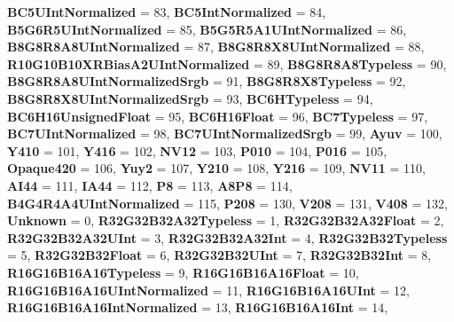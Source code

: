\begin{DoxyCompactItemize}
{\bfseries B\+C5\+U\+Int\+Normalized} = 83, 
{\bfseries B\+C5\+Int\+Normalized} = 84, 
\newline
{\bfseries B5\+G6\+R5\+U\+Int\+Normalized} = 85, 
{\bfseries B5\+G5\+R5\+A1\+U\+Int\+Normalized} = 86, 
{\bfseries B8\+G8\+R8\+A8\+U\+Int\+Normalized} = 87, 
{\bfseries B8\+G8\+R8\+X8\+U\+Int\+Normalized} = 88, 
\newline
{\bfseries R10\+G10\+B10\+X\+R\+Bias\+A2\+U\+Int\+Normalized} = 89, 
{\bfseries B8\+G8\+R8\+A8\+Typeless} = 90, 
{\bfseries B8\+G8\+R8\+A8\+U\+Int\+Normalized\+Srgb} = 91, 
{\bfseries B8\+G8\+R8\+X8\+Typeless} = 92, 
\newline
{\bfseries B8\+G8\+R8\+X8\+U\+Int\+Normalized\+Srgb} = 93, 
{\bfseries B\+C6\+H\+Typeless} = 94, 
{\bfseries B\+C6\+H16\+Unsigned\+Float} = 95, 
{\bfseries B\+C6\+H16\+Float} = 96, 
\newline
{\bfseries B\+C7\+Typeless} = 97, 
{\bfseries B\+C7\+U\+Int\+Normalized} = 98, 
{\bfseries B\+C7\+U\+Int\+Normalized\+Srgb} = 99, 
{\bfseries Ayuv} = 100, 
\newline
{\bfseries Y410} = 101, 
{\bfseries Y416} = 102, 
{\bfseries N\+V12} = 103, 
{\bfseries P010} = 104, 
\newline
{\bfseries P016} = 105, 
{\bfseries Opaque420} = 106, 
{\bfseries Yuy2} = 107, 
{\bfseries Y210} = 108, 
\newline
{\bfseries Y216} = 109, 
{\bfseries N\+V11} = 110, 
{\bfseries A\+I44} = 111, 
{\bfseries I\+A44} = 112, 
\newline
{\bfseries P8} = 113, 
{\bfseries A8\+P8} = 114, 
{\bfseries B4\+G4\+R4\+A4\+U\+Int\+Normalized} = 115, 
{\bfseries P208} = 130, 
\newline
{\bfseries V208} = 131, 
{\bfseries V408} = 132, 
{\bfseries Unknown} = 0, 
{\bfseries R32\+G32\+B32\+A32\+Typeless} = 1, 
\newline
{\bfseries R32\+G32\+B32\+A32\+Float} = 2, 
{\bfseries R32\+G32\+B32\+A32\+U\+Int} = 3, 
{\bfseries R32\+G32\+B32\+A32\+Int} = 4, 
{\bfseries R32\+G32\+B32\+Typeless} = 5, 
\newline
{\bfseries R32\+G32\+B32\+Float} = 6, 
{\bfseries R32\+G32\+B32\+U\+Int} = 7, 
{\bfseries R32\+G32\+B32\+Int} = 8, 
{\bfseries R16\+G16\+B16\+A16\+Typeless} = 9, 
\newline
{\bfseries R16\+G16\+B16\+A16\+Float} = 10, 
{\bfseries R16\+G16\+B16\+A16\+U\+Int\+Normalized} = 11, 
{\bfseries R16\+G16\+B16\+A16\+U\+Int} = 12, 
{\bfseries R16\+G16\+B16\+A16\+Int\+Normalized} = 13, 
\newline
{\bfseries R16\+G16\+B16\+A16\+Int} = 14, 

\end{DoxyCompactItemize}
